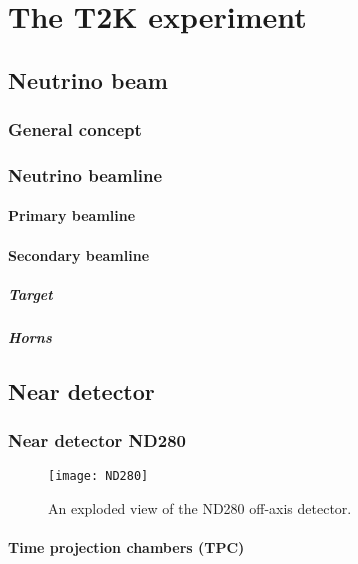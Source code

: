 \documentclass[../main.tex]{subfiles}
\begin{document}
\renewcommand{\labelitemi}{\ding{226}}
\renewcommand{\labelitemii}{\ding{227}}

\part{The T2K experiment}
\label{part:T2K:general}

\chapter{Neutrino beam}
\label{ch:T2K:nu_beam}
\section{General concept}
\section{Neutrino beamline}
\subsection{Primary beamline}
\subsection{Secondary beamline}
\subsubsection{Target}
\subsubsection{Horns}


\chapter{Near detector}
\label{ch:T2K:nd}
\section{Near detector ND280}
\label{sec:T2K:nd280}
\begin{figure}[h!]
    \begin{center}
    \texttt{[image: ND280]}
    \caption{An exploded view of the ND280 off-axis detector.}
    \label{fig:T2K:ND280}
    \end{center}
\end{figure}
\subsection{Time projection chambers (TPC)}
\end{document}
